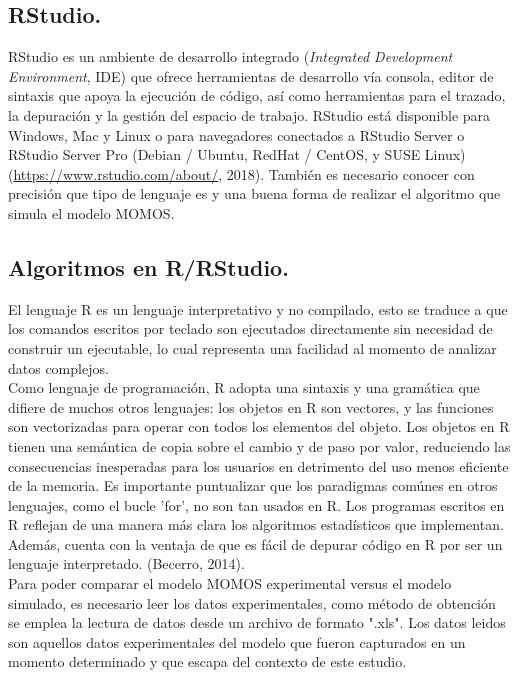\subsection{RStudio.}

RStudio es un ambiente de desarrollo integrado (\textit{Integrated Development Environment}, IDE) que ofrece herramientas de desarrollo vía consola, editor de sintaxis que apoya la ejecuci\'on de c\'odigo, así como herramientas para el trazado, la depuraci\'on y la gesti\'on del espacio de trabajo.  RStudio est\'a disponible para Windows, Mac y Linux o para navegadores conectados a RStudio Server o RStudio Server Pro (Debian / Ubuntu, RedHat / CentOS, y SUSE Linux) (\url{https://www.rstudio.com/about/}, 2018). Tambi\'en es necesario conocer con precisi\'on que tipo de lenguaje es y una buena forma de realizar el algoritmo que simula el modelo MOMOS.\\
 
 \subsection{Algoritmos en R/RStudio.}
 
El lenguaje R es un lenguaje interpretativo y no compilado, esto se traduce a que los comandos escritos por teclado son ejecutados directamente sin necesidad de construir un ejecutable, lo cual representa una facilidad al momento de analizar datos complejos. \\

Como lenguaje de programaci\'on, R adopta una sintaxis y una gram\'atica que difiere de muchos otros lenguajes: los objetos en R son vectores, y las funciones son vectorizadas para operar con todos los elementos del objeto. Los objetos en R tienen una sem\'antica de copia sobre el cambio y de paso por valor, reduciendo las consecuencias inesperadas para los usuarios en detrimento del uso menos eficiente de la memoria. Es importante puntualizar que los paradigmas com\'unes en otros lenguajes, como el bucle ’for’, no son tan usados en R. Los programas escritos en R reflejan de una manera m\'as clara los algoritmos estadísticos que implementan. Adem\'as, cuenta con la ventaja de que es f\'acil de depurar c\'odigo en R por ser un lenguaje interpretado. (Becerro, 2014).\\

Para poder comparar el modelo MOMOS experimental versus el modelo simulado, es necesario leer los datos experimentales, como m\'etodo de obtenci\'on se emplea la lectura de datos desde un archivo de formato ".xls". Los datos leidos son aquellos datos experimentales del modelo que fueron capturados en un momento determinado y que escapa del contexto de este estudio.\\

